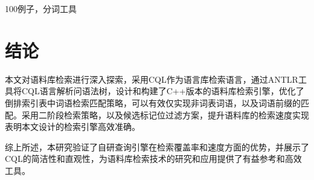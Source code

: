 \documentclass[11pt]{article}
\begin{document}
\begin{CJK*}{UTF8}{gbsn}
%
%

100例子，分词工具



\section{结论}

本文对语料库检索进行深入探索，采用CQL作为语言库检索语言，通过ANTLR工具将CQL语言解析问语法树，设计和构建了C++版本的语料库检索引擎，优化了倒排索引表中词语检索匹配策略，可以有效仅实现非词表词语，以及词语前缀的匹配。采用二阶段检索策略，以及候选标记位过滤方案，提升语料库的检索速度实现表明本文设计的检索引擎高效准确。

综上所述，本研究验证了自研查询引擎在检索覆盖率和速度方面的优势，并展示了CQL的简洁性和直观性，为语料库检索技术的研究和应用提供了有益参考和高效工具。




\end{CJK*}
\end{document}
